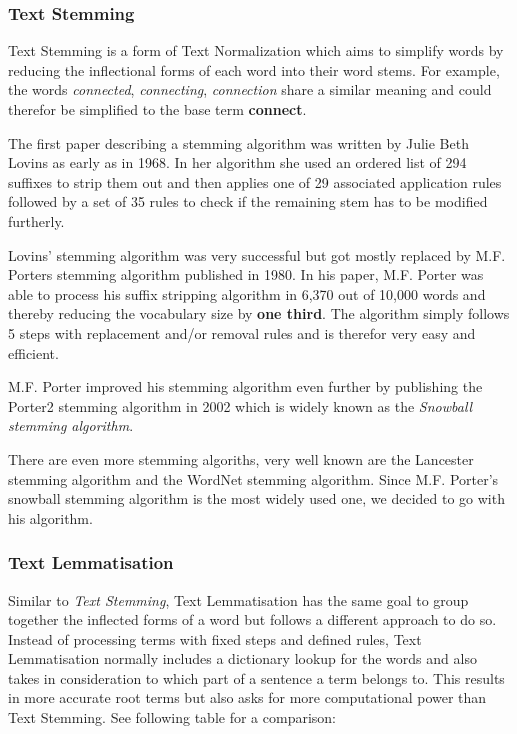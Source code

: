 
\subsubsection{Text Stemming}
Text Stemming is a form of Text Normalization which aims to simplify words
by reducing the inflectional forms of each word into their word stems.
For example, the words \textit{connected}, \textit{connecting}, \textit{connection} share a similar meaning and could
therefor be simplified to the base term \textbf{connect}.

The first paper describing a stemming algorithm was written by Julie Beth Lovins\cite{LovinsStemmer}
as early as in 1968.
In her algorithm she used an ordered list of 294 suffixes to strip them out and then applies one of
29 associated application rules followed by a set of 35 rules to check if the remaining stem has to be
modified furtherly.

Lovins' stemming algorithm was very successful but got mostly replaced by
M.F. Porters stemming algorithm\cite{PorterStemmerAlgorithm} published in 1980.
In his paper, M.F. Porter was able to process his suffix stripping algorithm in 6,370 out of 10,000 words and thereby
reducing the vocabulary size by \textbf{one third}.
The algorithm simply follows 5 steps with replacement and/or removal rules and is therefor very easy and efficient.

M.F. Porter improved his stemming algorithm even further by publishing the Porter2 stemming algorithm\cite{SnowballStemmerAlgorithm} in 2002
which is widely known as the \textit{Snowball stemming algorithm}.

There are even more stemming algoriths, very well known are the Lancester stemming algorithm\cite{LancesterStemmer}
and the WordNet stemming algorithm\cite{WordNetStemmer}.
Since M.F. Porter's snowball stemming algorithm is the most widely used one, we decided to go with his algorithm.

\subsubsection{Text Lemmatisation}
Similar to \textit{Text Stemming}, Text Lemmatisation has the same goal to group together the inflected forms of a word
but follows a different approach to do so.
Instead of processing terms with fixed steps and defined rules,
Text Lemmatisation normally includes a dictionary lookup for the words
and also takes in consideration to which part of a sentence a term belongs to.
This results in more accurate root terms but also asks for more computational power than Text Stemming.
See following table for a comparison:

